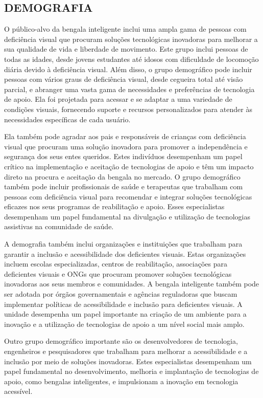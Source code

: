 \subsection{DEMOGRAFIA}
O público-alvo da bengala inteligente inclui uma ampla gama de pessoas com deficiência visual que procuram soluções tecnológicas inovadoras para melhorar a sua qualidade de vida e liberdade de movimento. Este grupo inclui pessoas de todas as idades, desde jovens estudantes até idosos com dificuldade de locomoção diária devido à deficiência visual.
Além disso, o grupo demográfico pode incluir pessoas com vários graus de deficiência visual, desde cegueira total até visão parcial, e abranger uma vasta gama de necessidades e preferências de tecnologia de apoio. Ela foi projetada para acessar e se adaptar a uma variedade de condições visuais, fornecendo suporte e recursos personalizados para atender às necessidades específicas de cada usuário.


Ela também pode agradar aos pais e responsáveis de crianças com deficiência visual que procuram uma solução inovadora para promover a independência e segurança dos seus entes queridos. Estes indivíduos desempenham um papel crítico na implementação e aceitação de tecnologias de apoio e têm um impacto direto na procura e aceitação da bengala no mercado.
O grupo demográfico também pode incluir profissionais de saúde e terapeutas que trabalham com pessoas com deficiência visual para recomendar e integrar soluções tecnológicas eficazes nos seus programas de reabilitação e apoio. Esses especialistas desempenham um papel fundamental na divulgação e utilização de tecnologias assistivas na comunidade de saúde.

A demografia também inclui organizações e instituições que trabalham para garantir a inclusão e acessibilidade dos deficientes visuais. Estas organizações incluem escolas especializadas, centros de reabilitação, associações para deficientes visuais e ONGs que procuram promover soluções tecnológicas inovadoras aos seus membros e comunidades.
A bengala inteligente também pode ser adotada por órgãos governamentais e agências reguladoras que buscam implementar políticas de acessibilidade e inclusão para deficientes visuais. A unidade desempenha um papel importante na criação de um ambiente para a inovação e a utilização de tecnologias de apoio a um nível social mais amplo.

Outro grupo demográfico importante são os desenvolvedores de tecnologia, engenheiros e pesquisadores que trabalham para melhorar a acessibilidade e a inclusão por meio de soluções inovadoras. Estes especialistas desempenham um papel fundamental no desenvolvimento, melhoria e implantação de tecnologias de apoio, como bengalas inteligentes, e impulsionam a inovação em tecnologia acessível.

